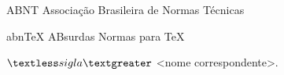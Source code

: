 \begin{siglas}
\item[ABNT] Associação Brasileira de Normas Técnicas
\item[abnTeX] ABsurdas Normas para TeX
\item[$\textless sigla\textgreater$]   \textless nome correspondente\textgreater.
\end{siglas}
